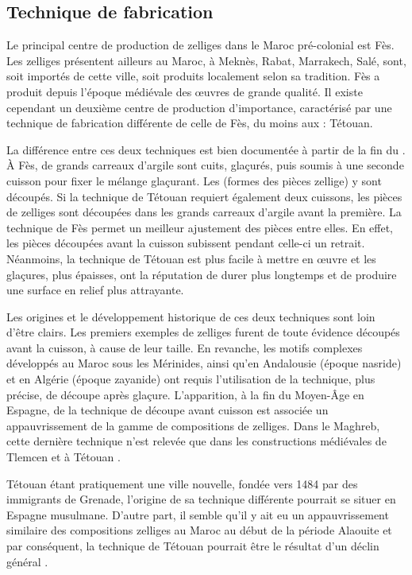 \subsection{Technique de fabrication}
Le principal centre de production de zelliges dans le Maroc 
pré-colonial est Fès. Les zelliges présentent ailleurs au Maroc, 
à Meknès, Rabat, Marrakech, Salé, sont, soit importés de cette ville, 
soit produits localement selon sa tradition. Fès a produit depuis 
l'époque médiévale des {\oe}uvres de grande qualité. Il existe 
cependant un deuxième centre de production d'importance, caractérisé 
par une technique de fabrication différente de celle de Fès, du moins 
aux  : Tétouan.

La différence entre ces deux techniques est bien documentée à partir 
de la fin du . À Fès, de grands carreaux d'argile sont 
cuits, glaçurés, puis soumis à une seconde cuisson pour fixer le 
mélange glaçurant. Les \furmas (formes des pièces zellige) y sont 
découpés. Si la technique de Tétouan requiert également deux 
cuissons, les pièces de zelliges sont découpées dans les grands 
carreaux d'argile avant la première. La technique de Fès permet un 
meilleur ajustement des pièces entre elles. En effet, les pièces 
découpées avant la cuisson subissent pendant celle-ci un retrait. 
Néanmoins, la technique de Tétouan est plus facile à mettre en 
{\oe}uvre et les glaçures, plus épaisses, ont la réputation de durer 
plus longtemps et de produire une surface en relief plus attrayante.

Les origines et le développement historique de ces deux 
techniques sont loin d'être clairs. Les premiers exemples de 
zelliges  furent de toute évidence découpés avant la cuisson, 
à cause de leur taille. En revanche, les motifs complexes développés 
au Maroc sous les Mérinides, ainsi qu'en Andalousie (époque nasride) 
et en Algérie (époque zayanide) ont requis l'utilisation de la 
technique, plus précise, de découpe après glaçure. L'apparition, 
à la fin du Moyen-Âge en Espagne, de la technique de découpe avant 
cuisson est associée un appauvrissement de la gamme de compositions 
de zelliges. Dans le Maghreb, cette dernière technique n'est relevée 
que dans les constructions médiévales de Tlemcen et à Tétouan 
\autocite{Erzini_1993a}.

Tétouan étant pratiquement une ville nouvelle, fondée vers 1484 
par des immigrants de Grenade, l'origine de sa technique différente 
pourrait se situer en Espagne musulmane. D'autre part, il semble 
qu'il y ait eu un appauvrissement similaire des compositions zelliges 
au Maroc au début de la période Alaouite et par conséquent, la 
technique de Tétouan pourrait être le résultat d'un déclin général 
\autocite{Erzini_1993b}.

